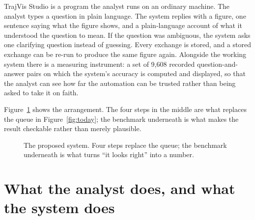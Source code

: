 \documentclass[12pt,a4paper]{report}
\begin{document}
TrajVis Studio is a program the analyst runs on an ordinary machine. The analyst
types a question in plain language. The system replies with a figure, one
sentence saying what the figure shows, and a plain-language account of what it
understood the question to mean. If the question was ambiguous, the system asks
one clarifying question instead of guessing. Every exchange is stored, and a
stored exchange can be re-run to produce the same figure again. Alongside the
working system there is a measuring instrument: a set of 9{,}608 recorded
question-and-answer pairs on which the system's accuracy is computed and
displayed, so that the analyst can see how far the automation can be trusted
rather than being asked to take it on faith.

Figure~\ref{fig:system} shows the arrangement. The four steps in the middle are
what replaces the queue in Figure~\ref{fig:today}; the benchmark underneath is
what makes the result checkable rather than merely plausible.

\begin{figure}[H]
  \centering
  \caption{The proposed system. Four steps replace the queue; the benchmark
    underneath is what turns ``it looks right'' into a number.}
  \label{fig:system}
\end{figure}

\section{What the analyst does, and what the system does}
\end{document}
